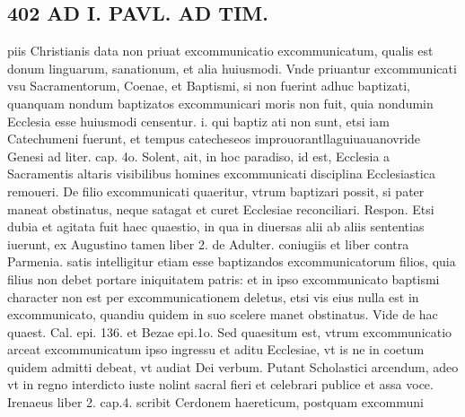 \documentclass{article}
\begin{document}
\begin{pages}
\section*{402 AD I. PAVL. AD TIM. }\pstart piis Christianis data non priuat excommunicatio excommunicatum, qualis est donum linguarum, sanationum, et alia huiusmodi. Vnde priuantur excommunicati vsu Sacramentorum, Coenae, et Baptismi, si non fuerint adhuc baptizati, quanquam nondum baptizatos excommunicari moris non fuit, quia nondumin Ecclesia esse huiusmodi censentur. i. qui baptiz ati non sunt, etsi iam Catechumeni fuerunt, et tempus catecheseos improuorantllaguiuauanovride Genesi ad liter. cap. 4o. Solent, ait, in hoc paradiso, id est, Ecclesia a Sacramentis altaris visibilibus homines excommunicati disciplina Ecclesiastica remoueri.  \pend\pstart De filio excommunicati quaeritur, vtrum baptizari possit, si pater maneat obstinatus, neque satagat et curet Ecclesiae reconciliari. Respon. Etsi dubia et agitata fuit haec quaestio, in qua in diuersas alii ab aliis sententias iuerunt, ex Augustino tamen liber 2. de Adulter. coniugiis et liber contra Parmenia. satis intelligitur etiam esse baptizandos excommunicatorum filios, quia filius non debet portare iniquitatem patris: et in ipso excommunicato baptismi character non est per excommunicationem deletus, etsi vis eius nulla est in excommunicato, quandiu quidem in suo scelere manet obstinatus. Vide de hac quaest. Cal. epi. 136. et Bezae epi.1o. Sed quaesitum est, vtrum excommunicatio arceat excommunicatum ipso ingressu et aditu Ecclesiae, vt is ne in coetum quidem admitti debeat, vt audiat Dei verbum. Putant Scholastici arcendum, adeo vt in regno interdicto iuste nolint sacral fieri et celebrari publice et assa voce. Irenaeus liber 2. cap.4. scribit Cerdonem haereticum, postquam excommuni\pend

\end{pages}
\end{document}

